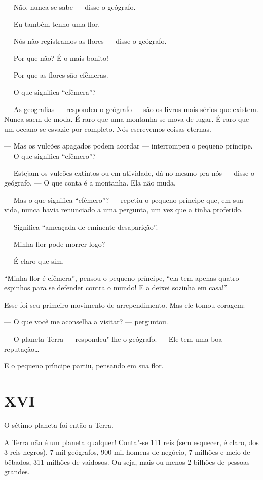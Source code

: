 \begin{Parallel}[p]{}{}
{--- Não, nunca se sabe --- disse o geógrafo.

--- Eu também tenho uma flor.

--- Nós não registramos as flores --- disse o geógrafo.

--- Por que não? É o mais bonito!

--- Por que as flores são efêmeras.

--- O que significa ``efêmera''?

--- As geografias --- respondeu o geógrafo --- são os livros mais sérios que
existem. Nunca saem de moda. É raro que uma montanha se mova de lugar. É
raro que um oceano se esvazie por completo. Nós escrevemos coisas
eternas.

--- Mas os vulcões apagados podem acordar --- interrompeu o pequeno
príncipe. --- O que significa ``efêmero''?

--- Estejam os vulcões extintos ou em atividade, dá no mesmo pra nós ---
disse o geógrafo. --- O que conta é a montanha. Ela não muda.

--- Mas o que significa ``efêmero''? --- repetiu o pequeno príncipe que, em
sua vida, nunca havia renunciado a uma pergunta, um vez que a tinha
proferido.

--- Significa ``ameaçada de eminente desaparição''.

--- Minha flor pode morrer logo?

--- É claro que sim.

``Minha flor é efêmera'', pensou o pequeno príncipe, ``ela tem apenas
quatro espinhos para se defender contra o mundo! E a deixei sozinha em
casa!''

Esse foi seu primeiro movimento de arrependimento. Mas ele tomou
coragem:

--- O que você me aconselha a visitar? --- perguntou.

--- O planeta Terra --- respondeu"-lhe o geógrafo. --- Ele tem uma boa
reputação\ldots{}

E o pequeno príncipe partiu, pensando em sua flor.

\section{XVI}

O sétimo planeta foi então a Terra.

A Terra não é um planeta qualquer! Conta"-se 111 reis (sem esquecer, é
claro, dos 3 reis negros), 7 mil geógrafos, 900 mil homens de negócio, 7
milhões e meio de bêbados, 311 milhões de vaidosos. Ou seja, mais ou
menos 2 bilhões de pessoas grandes.

}
\end{Parallel}
